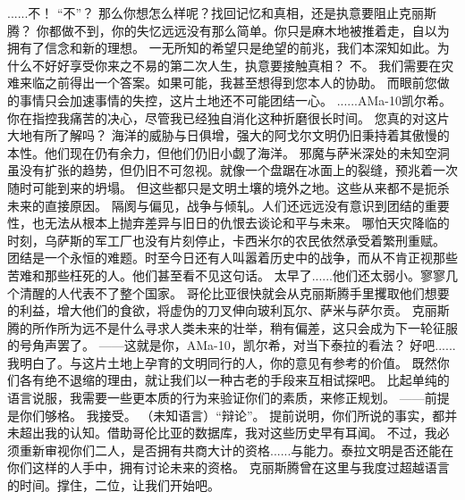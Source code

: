 \documentclass[openany]{book}
\begin{document}
\begin{dialogue}
     ......不！
     “不”？
     那么你想怎么样呢？找回记忆和真相，还是执意要阻止克丽斯腾？
     你都做不到，你的失忆远远没有那么简单。你只是麻木地被推着走，自以为拥有了信念和新的理想。
     一无所知的希望只是绝望的前兆，我们本深知如此。为什么不好好享受你来之不易的第二次人生，执意要接触真相？
     不。
     我们需要在灾难来临之前得出一个答案。如果可能，我甚至想得到您本人的协助。
     而眼前您做的事情只会加速事情的失控，这片土地还不可能团结一心。
     ......AMa-10凯尔希。
     你在指控我痛苦的决心，尽管我已经独自消化这种折磨很长时间。
     您真的对这片大地有所了解吗？
     海洋的威胁与日俱增，强大的阿戈尔文明仍旧秉持着其傲慢的本性。他们现在仍有余力，但他们仍旧小觑了海洋。
     邪魔与萨米深处的未知空洞虽没有扩张的趋势，但仍旧不可忽视。就像一个盘踞在冰面上的裂缝，预兆着一次随时可能到来的坍塌。
     但这些都只是文明土壤的境外之地。这些从来都不是扼杀未来的直接原因。
     隔阂与偏见，战争与倾轧。人们还远远没有意识到团结的重要性，也无法从根本上抛弃差异与旧日的仇恨去谈论和平与未来。
     哪怕天灾降临的时刻，乌萨斯的军工厂也没有片刻停止，卡西米尔的农民依然承受着繁刑重赋。
     团结是一个永恒的难题。时至今日还有人叫嚣着历史中的战争，而从不肯正视那些苦难和那些枉死的人。他们甚至看不见这句话。
     太早了......他们还太弱小。寥寥几个清醒的人代表不了整个国家。
     哥伦比亚很快就会从克丽斯腾手里攫取他们想要的利益，增大他们的食欲，将虚伪的刀叉伸向玻利瓦尔、萨米与萨尔贡。
     克丽斯腾的所作所为远不是什么寻求人类未来的壮举，稍有偏差，这只会成为下一轮征服的号角声罢了。
     ——这就是你，AMa-10，凯尔希，对当下泰拉的看法？
     好吧......我明白了。与这片土地上孕育的文明同行的人，你的意见有参考的价值。
     既然你们各有绝不退缩的理由，就让我们以一种古老的手段来互相试探吧。
     比起单纯的语言说服，我需要一些更本质的行为来验证你们的素质，来修正规划。
     ——前提是你们够格。
     我接受。
     （未知语言）“辩论”。
     提前说明，你们所说的事实，都并未超出我的认知。借助哥伦比亚的数据库，我对这些历史早有耳闻。
     不过，我必须重新审视你们二人，是否拥有共商大计的资格......与能力。泰拉文明是否还能在你们这样的人手中，拥有讨论未来的资格。
     克丽斯腾曾在这里与我度过超越语言的时间。撑住，二位，让我们开始吧。
\end{dialogue}
\end{document}
